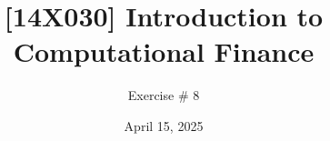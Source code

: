 \documentclass[12pt]{article}
\title{[14X030] Introduction to Computational Finance}
\author{Exercise \# 8}
\date{\small April 15, 2025}
\begin{document}
 

\maketitle 




\vfill

\vfill
\end{document}
